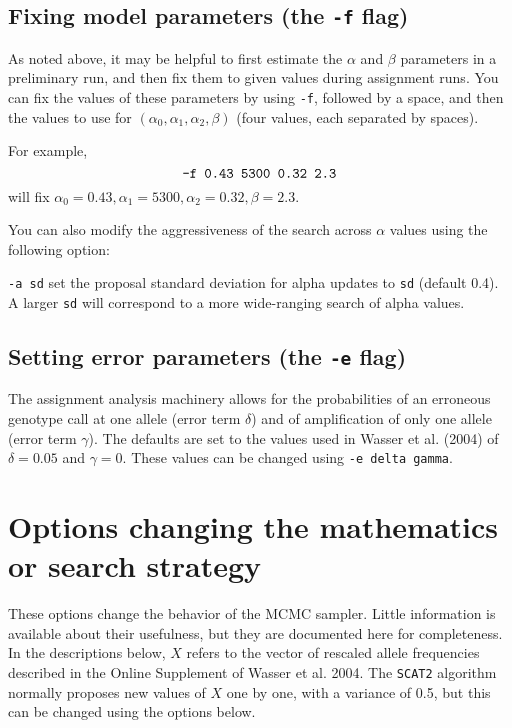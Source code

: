 \documentclass[10pt,titlepage,times,letterpaper]{article}
\def\SCAT{{\tt SCAT2} }
\begin{document}
\subsection{Fixing model parameters (the {\tt -f} flag)}

As noted above, it may be helpful to first estimate the $\alpha$ and
$\beta$ parameters in a preliminary run, and then fix them to given
values during assignment runs. You can fix the values of these
parameters by using {\tt -f}, followed by a space, and then the values
to use for $(\alpha_0,\alpha_1,\alpha_2,\beta)$ (four values, each
separated by spaces).

For example,
$$\text{\tt -f 0.43 5300 0.32 2.3}$$ will fix $\alpha_0 = 0.43, \alpha_1 =
5300, \alpha_2 = 0.32, \beta = 2.3$.

You can also modify the aggressiveness of the search across $\alpha$
values using the following option:

{\tt -a sd} set the proposal standard deviation for alpha updates to
{\tt sd} (default 0.4).  A larger {\tt sd} will correspond to a more
wide-ranging search of alpha values.

\subsection{Setting error parameters (the {\tt -e} flag)}

The assignment analysis machinery allows for the probabilities
of an erroneous genotype call at one allele
(error term $\delta$) and of amplification of only one allele (error term
$\gamma$).  The defaults are set to the values used in Wasser et al. (2004)
of $\delta = 0.05$ and $\gamma = 0$.  These values can be changed
using {\tt -e delta gamma}.


\section{Options changing the mathematics or search strategy}

These options change the behavior of the MCMC sampler.  Little information
is available about their usefulness, but they
are documented here for completeness.  In the descriptions below, $X$ refers
to the vector of rescaled allele frequencies described in the
Online Supplement of Wasser et al. 2004.  The \SCAT algorithm normally
proposes new values of $X$ one by one, with a variance of 0.5, but
this can be changed using the options below.
\end{document}
